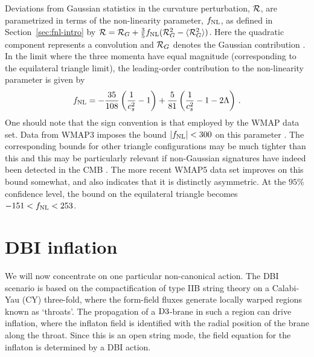 Deviations from Gaussian statistics in the curvature perturbation, ${\cal{R}}$,
are parametrized in terms of the non-linearity parameter, 
$f_{\mathrm{NL}}$, as defined in Section~\ref{sec:fnl-intro} by 
${\cal{R}} = {\cal{R}}_G + \frac{3}{5} f_{\mathrm{NL}}  (
{\cal{R}}_G^2 -\langle {\cal{R}}_G^2 \rangle )$. Here the 
quadratic component represents a convolution and 
${\cal{R}}_G$ denotes the Gaussian contribution \cite{maldacena}\footnotemark.
 In the limit  
where the three momenta have equal magnitude (corresponding to the equilateral  
triangle limit), the leading-order contribution to the non-linearity 
parameter is given by \cite{chenetal,lidser3}
% 
\begin{equation} 
\label{eq:fnldefn-dbiintro}
 f_{\mathrm{NL}} = -\frac{35}{108}\left(\frac{1}{c_s^2} -1 \right) +
\frac{5}{81}\left( \frac{1}{c_s^2} -1 -2\Lambda \right) \,.
\end{equation}
%  
One should note that the sign convention is that employed
by the WMAP data set.
Data from WMAP3 imposes the bound $|f_{\mathrm{NL}}| < 300$ on this parameter
\cite{spergel}. The corresponding bounds for other triangle configurations 
may be much tighter than this and this may be particularly relevant if 
non-Gaussian signatures have indeed been detected in the 
CMB \cite{Yadav:2007yy,crim}. The more recent WMAP5 data set
\cite{Komatsu:2008hk} improves on this bound somewhat, and
also indicates that it is distinctly asymmetric. At the $95 \%$ confidence level, the bound on the 
equilateral triangle becomes $-151 < f_{\mathrm{NL}} < 253$.


% 
% 
\section{DBI inflation} 
% 
\label{sec:dbiinflation}
We will now concentrate on one particular non-canonical action. 
The DBI scenario is based on the compactification of type IIB string theory on a 
Calabi-Yau (CY) three-fold, where the form-field fluxes generate locally
warped regions known as `throats'.  The propagation of a 
${\rm D3}$-brane in such a region can drive inflation, where the inflaton 
field is identified with the radial position of the brane 
along the throat. Since this is an open string mode, the field 
equation for the inflaton is determined by a DBI action.

